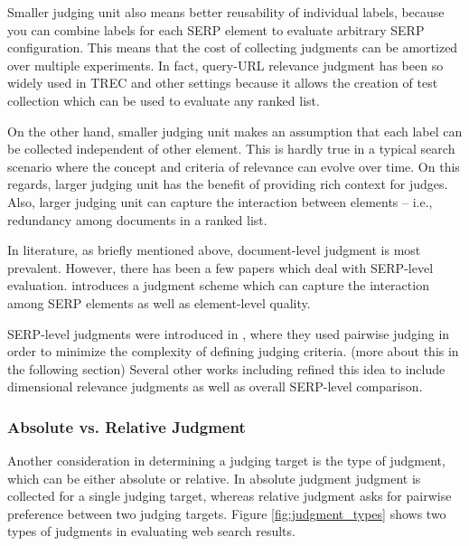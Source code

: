 \documentclass[openany]{now} %
\begin{document}
Smaller judging unit also means better reusability of individual labels, because you can combine labels for each SERP element to evaluate arbitrary SERP configuration. This means that the cost of collecting judgments can be amortized over multiple experiments. In fact, query-URL relevance judgment has been so widely used in TREC and other settings because it allows the creation of test collection which can be used to evaluate any ranked list.

On the other hand, smaller judging unit makes an assumption that each label can be collected independent of other element. This is hardly true in a typical search scenario where the concept and criteria of relevance can evolve over time. On this regards, larger judging unit has the benefit of providing rich context for judges. Also, larger judging unit can capture the interaction between elements -- i.e., redundancy among documents in a ranked list.

In literature, as briefly mentioned above, document-level judgment is most prevalent. However, there has been a few papers which deal with SERP-level evaluation. \cite{Bailey2010} introduces a judgment scheme which can capture the interaction among SERP elements as well as element-level quality. 

SERP-level judgments were introduced in \cite{Thomas2006}, where they used pairwise judging in order to minimize the complexity of defining judging criteria. (more about this in the following section) Several other works including  \cite{Kim:2013} refined this idea to include dimensional relevance judgments as well as overall SERP-level comparison.

\subsubsection{Absolute vs. Relative Judgment}
Another consideration in determining a judging target is the type of judgment, which can be either absolute or relative. In absolute judgment judgment is collected for a single judging target, whereas relative judgment asks for pairwise preference between two judging targets. Figure \ref{fig:judgment_types} shows two types of judgments in evaluating web search results.
\end{document}
